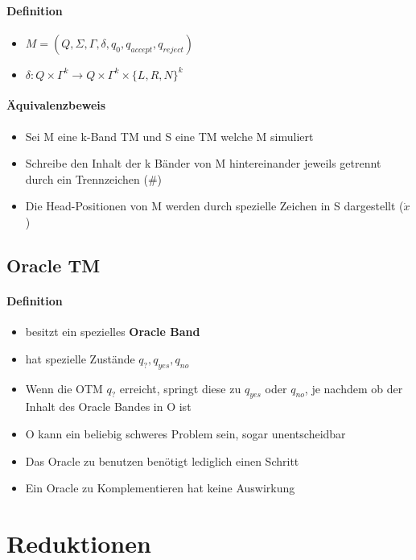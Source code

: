 \documentclass[12pt,a4paper]{article}
\begin{document}
\paragraph{Definition}
\flushleft
\begin{itemize}
\item $M=(Q, \Sigma, \Gamma, \delta, q_0, q_{accept}, q_{reject})$
\item $\delta: Q \times \Gamma^k \rightarrow Q \times \Gamma^k \times \{L, R, N\}^k$
\end{itemize}
\paragraph{Äquivalenzbeweis}
\flushleft
\begin{itemize}
\item Sei M eine k-Band TM und S eine TM welche M simuliert
\item Schreibe den Inhalt der k Bänder von M hintereinander jeweils getrennt durch ein Trennzeichen ($\#$)
\item Die Head-Positionen von M werden durch spezielle Zeichen in S dargestellt ($\dot{x}$)
\end{itemize}

\subsection{Oracle TM}
\paragraph{Definition}
\flushleft
\begin{itemize}
\item besitzt ein spezielles \textbf{Oracle Band}
\item hat spezielle Zustände $q_?, q_{yes}, q_{no}$
\item Wenn die OTM $q_?$ erreicht, springt diese zu $q_{yes}$ oder $q_{no}$, je nachdem ob der Inhalt des Oracle Bandes in O ist
\item O kann ein beliebig schweres Problem sein, sogar unentscheidbar
\item Das Oracle zu benutzen benötigt lediglich einen Schritt
\item Ein Oracle zu Komplementieren hat keine Auswirkung
\end{itemize}

\section{Reduktionen}
\end{document}

